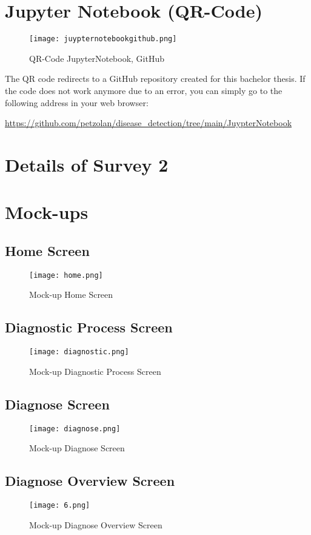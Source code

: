 \pagebreak
\chapter{Jupyter Notebook (QR-Code)}
\begin{figure}[H]
	\centering
	\texttt{[image: juypternotebookgithub.png]}
	\caption{QR-Code JupyterNotebook, GitHub}
\end{figure}
The QR code redirects to a GitHub repository created for this bachelor thesis. If the code does not work anymore due to an error, you can simply go to the following address in your web browser:
\begin{center}
	\url{https://github.com/petzolan/disease_detection/tree/main/JuypterNotebook}
\end{center}



\chapter{Details of Survey 2}




\chapter{Mock-ups}
\section{Home Screen}
\begin{figure}[H]
	\centering
	\texttt{[image: home.png]}
	\caption{Mock-up Home Screen}
\end{figure}
\pagebreak
\section{Diagnostic Process Screen}
\begin{figure}[H]
	\centering
	\texttt{[image: diagnostic.png]}
	\caption{Mock-up Diagnostic Process Screen}
\end{figure}
\pagebreak
\section{Diagnose Screen}
\begin{figure}[H]
	\centering
	\texttt{[image: diagnose.png]}
	\caption{Mock-up Diagnose Screen}
\end{figure}
\pagebreak
\section{Diagnose Overview Screen}
\begin{figure}[H]
	\centering
	\texttt{[image: 6.png]}
	\caption{Mock-up Diagnose Overview Screen}
\end{figure}
\pagebreak
